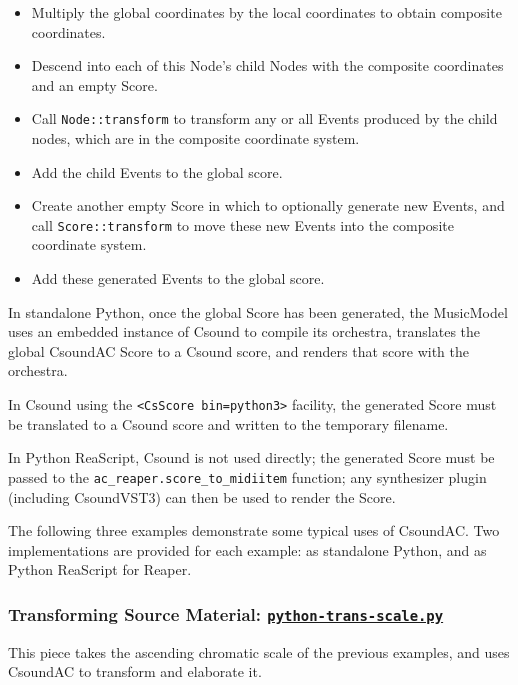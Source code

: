 \documentclass[letterpaper,10pt,DIV=12,parskip=half]{scrartcl}
\begin{document}
\begin{itemize}
\item Multiply the global coordinates by the local coordinates to obtain composite coordinates.
\item Descend into each of this Node's child Nodes with the composite coordinates and an empty Score.
\item Call \lstinline|Node::transform| to transform any or all Events produced by the child nodes, which are in the composite coordinate system.
\item Add the child Events to the global score.
\item Create another empty Score in which to optionally generate new Events, and call \lstinline|Score::transform| to move these new Events into the composite coordinate system.
\item Add these generated Events to the global score.
\end{itemize}

In standalone Python, once the global Score has been generated, the MusicModel uses an embedded instance of Csound to compile its orchestra, translates the global CsoundAC Score to a Csound score, and renders that score with the orchestra.

In Csound using the \lstinline|<CsScore bin=python3>| facility, the generated Score must be translated to a Csound score and written to the temporary filename.

In Python ReaScript, Csound is not used directly; the generated Score must be passed to the \lstinline|ac_reaper.score_to_midiitem| function; any synthesizer plugin (including CsoundVST3) can then be used to render the Score.

The following three examples demonstrate some typical uses of CsoundAC. Two implementations are provided for each example: as standalone Python, and as Python ReaScript for Reaper.

\subsubsection{Transforming Source Material: \href{https://github.com/gogins/csound-ac/blob/master/user-guide/python-trans-scale.py}{\lstinline|python-trans-scale.py|}}

This piece takes the ascending chromatic scale of the previous examples, and uses CsoundAC to transform and elaborate it. 
\end{document}
